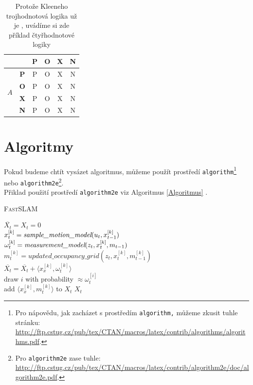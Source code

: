 \documentclass[11pt,a4paper]{article}
\begin{document}
\begin{table}[h]
\begin{center}
\begin{tabular}[p]{|c|c|c|c|c|c|}
             \multicolumn{2}{|c|}{} & \textbf{P} & \textbf{O} & \textbf{X} & \textbf{N} \\ \hline
             \multirow{4}{*}{$A$} & \textbf{P} & P & O & X & N \\ \cline{2-6}
             & \textbf{O} & P & O & X & N \\ \cline{2-6}
             & \textbf{X} & P & O & X & N \\ \cline{2-6}
             & \textbf{N} & P & O & X & N \\ \hline
        \end{tabular}
        \caption{Protože Kleeneho trojhodnotová logika už je , uvádíme si zde příklad čtyřhodnotové logiky}
        \label{tab2}
    \end{center}
\end{table}

\bigskip
\pagebreak

\section{Algoritmy}
Pokud budeme chtít vysázet algoritmus, můžeme použít prostředí \texttt{algorithm}\footnote{Pro nápovědu, jak zacházet s prostředím \texttt{algorithm,} můžeme zkusit tuhle stránku: \\ \href{http://ftp.cstug.cz/pub/tex/CTAN/macros/latex/contrib/algorithms/algorithms.pdf}{http://ftp.cstug.cz/pub/tex/CTAN/macros/latex/contrib/algorithms/algorithms.pdf}.
} nebo \texttt{algorithm2e}\footnote{Pro \texttt{algorithm2e} zase tuhle:  \href{http://ftp.cstug.cz/pub/tex/CTAN/macros/latex/contrib/algorithm2e/doc/algorithm2e.pdf}{http://ftp.cstug.cz/pub/tex/CTAN/macros/latex/contrib/algorithm2e/doc/algorithm2e.pdf}.
}.\\ Přiklad použití prostředí \texttt{algorithm2e} viz Algoritmus \ref{Algoritmus} .

\IncMargin{1.5em}
\begin{algorithm}
    \label{Algoritmus}
	\caption{\textsc{FastSLAM}}
    \SetNlSty{}{}{:}
	\SetInd{1em}{1em}
	\Indm \Indmm
	\Indp \Indpp
	\BlankLine
	$\overline{X_t} = X_t = 0$ \\
	{
	    $x_t^{[k]} = \emph{sample\_motion\_model}(u_t, x_{t-1}^{[k]})$\\
	    $\omega_t^{[k]} = \emph{measurement\_model}(z_t, x_t^{[k]}, m_{t-1})$\\
	    $m_t^{[k]} = updated\_occupancy\_grid(z_t, x_t^{[k]}, m_{t-1}^{[k]})$\\
	    $\overline{X_t} = \overline{X_t} + \langle x_x^{[k]}, \omega_t^{[k]} \rangle$\\
    }
    {
        draw $i$ with probability $\approx \omega_t^{[i]}$\\
        add $\langle x_x^{[k]}, m_t^{[k]} \rangle$ to $X_t$
    }
    \Return $X_t$
\end{algorithm}
\DecMargin{1.5em}
\end{document}
